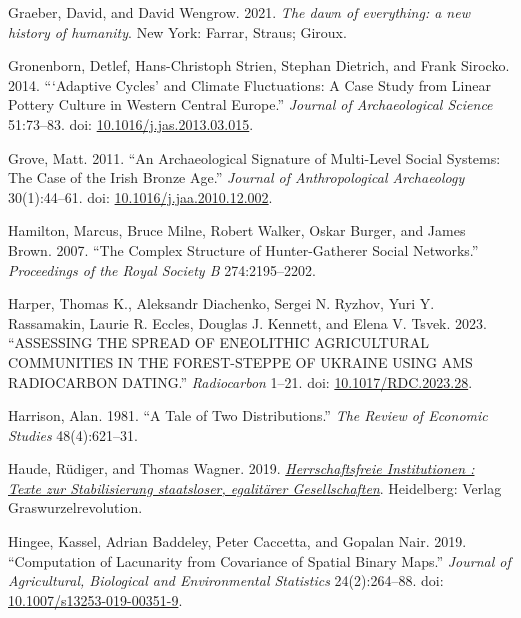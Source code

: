 \documentclass[
  12pt,
]{book}
\newlength{\cslhangindent}
\newlength{\cslentryspacingunit} %
\newenvironment{CSLReferences}[2] %
 {%
  \setlength{\parindent}{0pt}
  \ifodd #1
  \let\oldpar\par
  \def\par{\hangindent=\cslhangindent\oldpar}
  \fi
  \setlength{\parskip}{#2\cslentryspacingunit}
 }%
 {}
\begin{document}
\begin{CSLReferences}{1}{0}
\leavevmode{}%
Graeber, David, and David Wengrow. 2021. \emph{The dawn of everything: a new history of humanity}. New York: Farrar, Straus; Giroux.

\leavevmode{}%
Gronenborn, Detlef, Hans-Christoph Strien, Stephan Dietrich, and Frank Sirocko. 2014. {``{`}Adaptive Cycles{'} and Climate Fluctuations: A Case Study from Linear Pottery Culture in Western Central Europe.''} \emph{Journal of Archaeological Science} 51:73--83. doi: \href{https://doi.org/10.1016/j.jas.2013.03.015}{10.1016/j.jas.2013.03.015}.

\leavevmode{}%
Grove, Matt. 2011. {``An Archaeological Signature of Multi-Level Social Systems: The Case of the Irish Bronze Age.''} \emph{Journal of Anthropological Archaeology} 30(1):44--61. doi: \href{https://doi.org/10.1016/j.jaa.2010.12.002}{10.1016/j.jaa.2010.12.002}.

\leavevmode{}%
Hamilton, Marcus, Bruce Milne, Robert Walker, Oskar Burger, and James Brown. 2007. {``The Complex Structure of Hunter-Gatherer Social Networks.''} \emph{Proceedings of the Royal Society B} 274:2195--2202.

\leavevmode{}%
Harper, Thomas K., Aleksandr Diachenko, Sergei N. Ryzhov, Yuri Y. Rassamakin, Laurie R. Eccles, Douglas J. Kennett, and Elena V. Tsvek. 2023. {``ASSESSING THE SPREAD OF ENEOLITHIC AGRICULTURAL COMMUNITIES IN THE FOREST-STEPPE OF UKRAINE USING AMS RADIOCARBON DATING.''} \emph{Radiocarbon} 1--21. doi: \href{https://doi.org/10.1017/RDC.2023.28}{10.1017/RDC.2023.28}.

\leavevmode{}%
Harrison, Alan. 1981. {``A Tale of Two Distributions.''} \emph{The Review of Economic Studies} 48(4):621--31.

\leavevmode{}%
Haude, Rüdiger, and Thomas Wagner. 2019. \emph{\href{http://www.deutsche-digitale-bibliothek.de/item/7WYRGHTXGAOZOF5JUQ5JQCONFJKLTBIE}{Herrschaftsfreie Institutionen : Texte zur Stabilisierung staatsloser, egalitärer Gesellschaften}}. Heidelberg: Verlag Graswurzelrevolution.

\leavevmode{}%
Hingee, Kassel, Adrian Baddeley, Peter Caccetta, and Gopalan Nair. 2019. {``Computation of Lacunarity from Covariance of Spatial Binary Maps.''} \emph{Journal of Agricultural, Biological and Environmental Statistics} 24(2):264--88. doi: \href{https://doi.org/10.1007/s13253-019-00351-9}{10.1007/s13253-019-00351-9}.


\end{CSLReferences}
\end{document}
